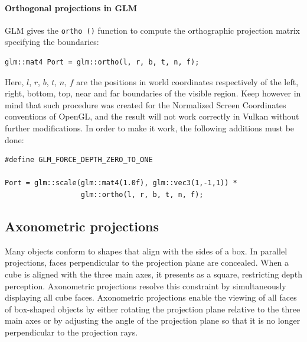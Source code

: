 \paragraph*{Orthogonal projections in GLM}
GLM gives the \texttt{ortho ()} function to compute the orthographic projection matrix specifying the boundaries:
\begin{verbatim}
glm::mat4 Port = glm::ortho(l, r, b, t, n, f);
\end{verbatim}
Here, $l$, $r$, $b$, $t$, $n$, $f$ are the positions in world coordinates respectively of the left, right, bottom, top, near and far boundaries of the visible region.
Keep however in mind that such procedure was created for the Normalized Screen Coordinates conventions of OpenGL, and the result will not work correctly in Vulkan without further modifications.
In order to make it work, the following additions must be done: 
\begin{verbatim}
#define GLM_FORCE_DEPTH_ZERO_TO_ONE    

Port = glm::scale(glm::mat4(1.0f), glm::vec3(1,-1,1)) * 
                  glm::ortho(l, r, b, t, n, f);
\end{verbatim}

\subsection{Axonometric projections}
Many objects conform to shapes that align with the sides of a box. 
In parallel projections, faces perpendicular to the projection plane are concealed. When a cube is aligned with the three main axes, it presents as a square, restricting depth perception. 
Axonometric projections resolve this constraint by simultaneously displaying all cube faces.
Axonometric projections enable the viewing of all faces of box-shaped objects by either rotating the projection plane relative to the three main axes or by adjusting the angle of the projection plane so that it is no longer perpendicular to the projection rays.

